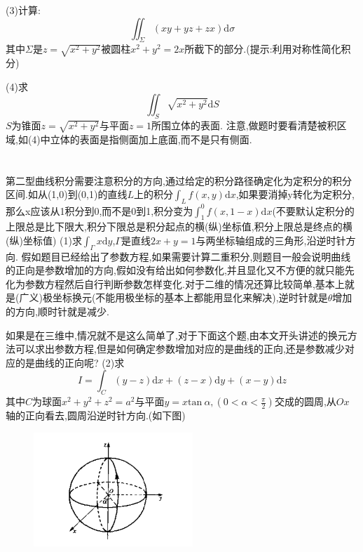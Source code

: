 \documentclass{ctexart}
\begin{document}
(3)计算:$$\iint_{\Sigma}(xy+yz+zx)\mathrm{d}\sigma$$
其中$\Sigma$是$z=\sqrt{x^{2}+y^{2}}$被圆柱$x^{2}+y^{2}=2x$所截下的部分.(提示:利用对称性简化积分)

(4)求$$\iint_{S}\sqrt{x^{2}+y^{2}}\mathrm{d}S$$
$S$为锥面$z=\sqrt{x^{2}+y^{2}}$与平面$z=1$所围立体的表面.
\newline
\newline
注意,做题时要看清楚被积区域,如(4)中立体的表面是指侧面加上底面,而不是只有侧面.
\section{}
第二型曲线积分需要注意积分的方向,通过给定的积分路径确定化为定积分的积分区间.如从(1,0)到(0,1)的直线$L$上的积分$\int_{L}f(x,y)\mathrm{d}x$,如果要消掉y转化为定积分,那么x应该从1积分到0,而不是0到1,积分变为$\int_{1}^{0}f(x,1-x)\mathrm{d}x$(不要默认定积分的上限总是比下限大,积分下限总是积分起点的横(纵)坐标值,积分上限总是终点的横(纵)坐标值)
\newline
\newline
(1)求$\int_{\Gamma}x\mathrm{d}y$,$\Gamma$是直线$2x+y=1$与两坐标轴组成的三角形,沿逆时针方向.
\newline
\newline
假如题目已经给出了参数方程,如果需要计算二重积分,则题目一般会说明曲线的正向是参数增加的方向,假如没有给出如何参数化,并且显化又不方便的就只能先化为参数方程然后自行判断参数怎样变化.对于二维的情况还算比较简单,基本上就是(广义)极坐标换元(不能用极坐标的基本上都能用显化来解决),逆时针就是$\theta$增加的方向,顺时针就是减少.

如果是在三维中,情况就不是这么简单了,对于下面这个题,由本文开头讲述的换元方法可以求出参数方程,但是如何确定参数增加对应的是曲线的正向,还是参数减少对应的是曲线的正向呢?
\newline
\newline
(2)求$$I=\int_{C}(y-z)\mathrm{d}x+(z-x)\mathrm{d}y+(x-y)\mathrm{d}z$$
其中$C$为球面$x^{2}+y^{2}+z^{2}=a^{2}$与平面$y=x\mathrm{tan}\ \alpha,(0<\alpha<\frac{\pi}{2})$交成的圆周,从$Ox$轴的正向看去,圆周沿逆时针方向.(如下图)

\begin{figure}[h!]

  \includegraphics[width=6cm]{2.png}\\
\end{figure}
\end{document}
